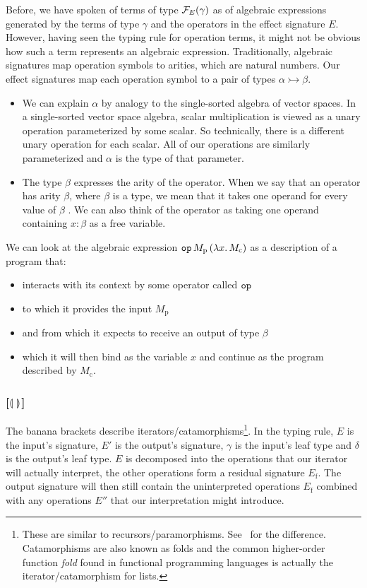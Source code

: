 \documentclass{llncs}
\begin{document}
Before, we have spoken of terms of type $\mathcal{F}_E(\gamma)$ as of algebraic
expressions generated by the terms of type $\gamma$ and the operators in
the effect signature $E$. However, having seen the typing rule for
operation terms, it might not be obvious how such a term represents an
algebraic expression. Traditionally, algebraic signatures map operation
symbols to arities, which are natural numbers. Our effect signatures map
each operation symbol to a pair of types $\alpha \rightarrowtail \beta$.
\begin{itemize}
\item We can explain $\alpha$ by analogy to the single-sorted algebra of
  vector spaces. In a single-sorted vector space algebra, scalar
  multiplication is viewed as a unary operation parameterized by some
  scalar. So technically, there is a different unary operation for each
  scalar. All of our operations are similarly parameterized and $\alpha$ is
  the type of that parameter.
\item The type $\beta$ expresses the arity of the operator. When we say
  that an operator has arity $\beta$, where $\beta$ is a type, we mean that
  it takes one operand for every value of $\beta$
  \cite{pretnar2010logic}. We can also think of the operator as taking one
  operand containing $x : \beta$ as a free variable.
\end{itemize}

We can look at the algebraic expression
$\mathtt{op}\,M_{\mathrm{p}}\,(\lambda x.\, M_{\mathrm{c}})$ as a description
of a program that:
\begin{itemize}
\item interacts with its context by some operator called $\mathtt{op}$
\item to which it provides the input $M_{\mathrm{p}}$
\item and from which it expects to receive an output of type $\beta$
\item which it will then bind as the variable $x$ and continue as the
  program described by $M_{\mathrm{c}}$.
\end{itemize}

\subsubsection*{[$\llparenthesis \,  \, \rrparenthesis$]}

The banana brackets describe iterators/catamorphisms\footnote{These are
  similar to recursors/paramorphisms. See~\cite{meijer1991functional} for
  the difference. Catamorphisms are also known as folds and the common
  higher-order function \emph{fold} found in functional programming
  languages is actually the iterator/catamorphism for lists.}. In the
typing rule, $E$ is the input's signature, $E'$ is the output's signature,
$\gamma$ is the input's leaf type and $\delta$ is the output's leaf
type. $E$ is decomposed into the operations that our iterator will actually
interpret, the other operations form a residual signature
$E_{\mathrm{f}}$. The output signature will then still contain the
uninterpreted operations $E_{\mathrm{f}}$ combined with any operations
$E''$ that our interpretation might introduce.
\end{document}
